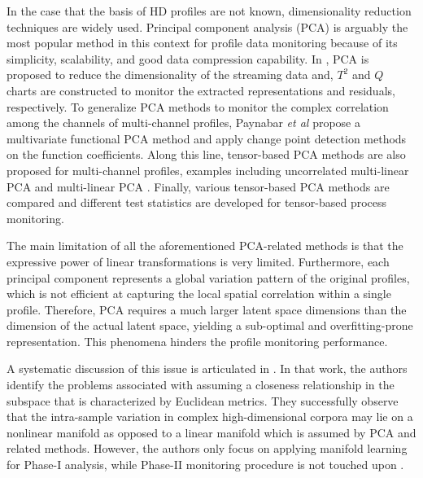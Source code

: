 \documentclass[journal, peerreview]{IEEEtran}
\begin{document}
In the case that the basis of HD profiles are not known, dimensionality reduction techniques are widely used. Principal component analysis (PCA) is arguably the most popular method in this context for profile data monitoring because of its simplicity, scalability, and good data compression capability. 
In \cite{liu1995control}, PCA is proposed to reduce the dimensionality of the streaming data and, $T^{2}$ and $Q$ charts are constructed to monitor the extracted representations and residuals, respectively. 
To generalize PCA methods to monitor the complex correlation among the channels of multi-channel profiles, Paynabar \textit{et al} \cite{paynabar2015change} propose a multivariate functional PCA method and apply change point detection methods on the function coefficients.
Along this line, tensor-based PCA methods are also proposed for multi-channel profiles, examples including uncorrelated multi-linear PCA \cite{paynabar2013monitoring} and multi-linear PCA \cite{grasso2014profile}. 
Finally, various tensor-based PCA methods \cite{yan2015image} are compared and different test statistics are developed for tensor-based process monitoring.

The main limitation of all the aforementioned PCA-related methods is that the expressive power of linear transformations is very limited. Furthermore, each principal component represents a global variation pattern of the original profiles, which is not efficient at capturing the local spatial correlation within a single profile. Therefore, PCA requires a much larger latent space dimensions than the dimension of the actual latent space, yielding a sub-optimal and overfitting-prone representation. This phenomena hinders the profile monitoring performance. 

A systematic discussion of this issue is articulated in \cite{Shi2016-tg}. 
In that work, the authors identify the problems associated with assuming a closeness relationship in the subspace that is characterized by Euclidean metrics.
They successfully observe that the intra-sample variation in complex high-dimensional corpora may lie on a nonlinear manifold as opposed to a linear manifold which is assumed by PCA and related methods. However, the authors only focus on applying manifold learning for Phase-I analysis, while Phase-II monitoring procedure is not touched upon \cite{Shi2016-tg}.
\end{document}
